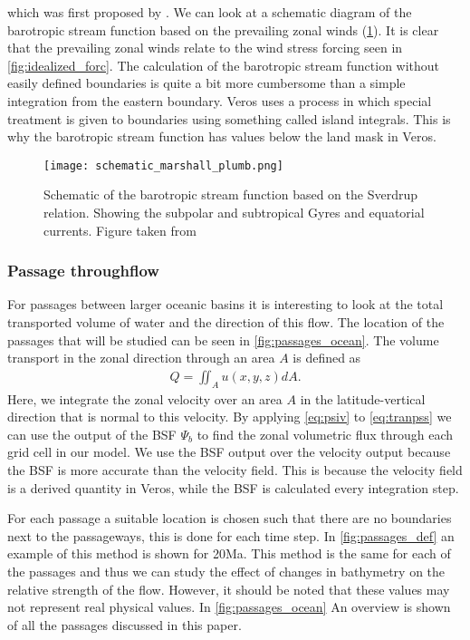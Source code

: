 \begin{multicols}{2}
which was first proposed by \cite{sverdrup1947wind}. We can look at a schematic diagram of the barotropic stream function based on the prevailing zonal winds (\cref{fig:schem_currents}). It is clear that the prevailing zonal winds relate to the wind stress forcing seen in \cref{fig:idealized_forc}. The calculation of the barotropic stream function without easily defined boundaries is quite a bit more cumbersome than a simple integration from the eastern boundary. Veros uses a process in which special treatment is given to boundaries using something called island integrals. This is why the barotropic stream function has values below the land mask in Veros. 
 
  \begin{figure}[H]
 	\texttt{[image: schematic\_marshall\_plumb.png]}
 	\caption{Schematic of the barotropic stream function based on the Sverdrup relation. Showing the subpolar and subtropical Gyres and equatorial currents. Figure taken from \cite{MarschallPlumb}}
 	\label{fig:schem_currents}
 \end{figure}
\newpage
\subsubsection{Passage throughflow}\label{sec:throughflowp}
For passages between larger oceanic basins it is interesting to look at the total transported volume of water and the direction of this flow. The location of the passages that will be studied can be seen in \cref{fig:passages_ocean}. The volume transport in the zonal direction through an area $A$ is defined as
\begin{align}
Q = \iint_A u(x,y,z) dA. \label{eq:tranpss}
\end{align}	
Here, we integrate the zonal velocity over an area $A$ in the latitude-vertical direction that is normal to this velocity. By applying \cref{eq:psiv} to \cref{eq:tranpss} we can use the output of the BSF $\Psi_b$ to find the zonal volumetric flux through each grid cell in our model. We use the BSF output over the velocity output because the BSF is more accurate than the velocity field. This is because the velocity field is a derived quantity in Veros, while the BSF is calculated every integration step.

For each passage a suitable location is chosen such that there are no boundaries next to the passageways, this is done for each time step. In \cref{fig:passages_def} an example of this method is shown for 20Ma. This method is the same for each of the passages and thus we can study the effect of changes in bathymetry on the relative strength of the flow. However, it should be noted that these values may not represent real physical values. In \cref{fig:passages_ocean} An overview is shown of all the passages discussed in this paper.



\end{multicols}
